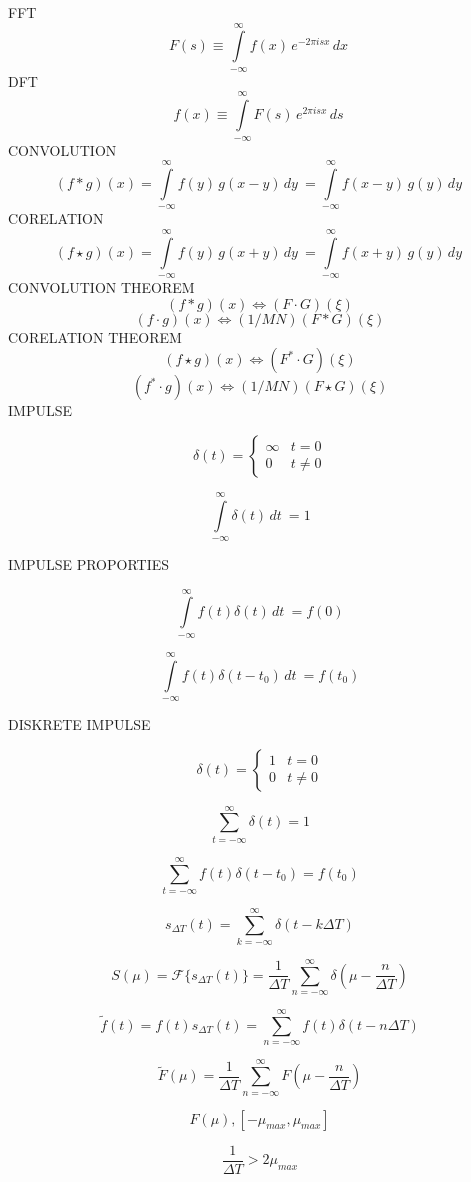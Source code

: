 \documentclass[12pt]{article}
\begin{document}
FFT
$$
F(s) 
\equiv
{\int\limits_{-\infty}^{\infty}f(x)\,e^{-2\pi i s x}\,dx~}
$$
DFT
$$
f(x) 
\equiv
{\int\limits_{-\infty}^{\infty}F(s)\,e^{2\pi i s x}\,ds~}
$$
CONVOLUTION
$$
(f*g)(x)
=
{\int\limits_{-\infty}^{\infty} f(y)\,g(x-y)\,dy~} 
=
{\int\limits_{-\infty}^{\infty} f(x-y)\,g(y)\,dy~}  
$$
CORELATION
$$
(f \star g)(x) 
= 
{\int\limits_{-\infty}^{\infty} f(y)\,g(x+y)\,dy~} 
= 
{\int\limits_{-\infty}^{\infty} f(x+y)\,g(y)\,dy~}  
$$
CONVOLUTION THEOREM
$$
{(f*g)(x)}
\Leftrightarrow 
{(F \cdot G )(\xi)}
$$
$$
{(f \cdot g)(x)}
\Leftrightarrow 
{(1/MN)(F*G )(\xi)}
$$
CORELATION THEOREM
$$
{(f \star g)(x)} 
\Leftrightarrow
{(F^* \cdot G)(\xi)}
$$
$$
{(f^*  \cdot g)(x)} 
\Leftrightarrow
{(1/MN)(F \star G)(\xi)}
$$
IMPULSE

$$
\delta(t)=
\begin{cases}
\infty & t = 0 \\
0	 & t \neq 0
\end{cases}
$$

$$
{\int\limits_{-\infty}^{\infty}\delta(t)\,dt~}
=
1
$$

IMPULSE PROPORTIES

$$
{\int\limits_{-\infty}^{\infty}f(t)\delta(t)\,dt~}
=
f(0)
$$

$$
{\int\limits_{-\infty}^{\infty}f(t)\delta(t-t_{0})\,dt~}
=
f(t_{0})
$$

DISKRETE IMPULSE

$$
\delta(t)=
\begin{cases}
1 & t = 0 \\
0	 & t \neq 0
\end{cases}
$$

$$
\sum_{t = - \infty}^{\infty} \delta(t) 
=
1
$$

$$
\sum_{t = - \infty}^{\infty} f(t) 
\delta(t - t_{0}) 
=
f(t_{0})
$$

$$
s_{\varDelta T}(t) 
=
\sum_{k=-\infty}^{\infty}
\delta(t - k\varDelta T)
$$

$$
S(\mu) = \mathcal{F}
\{ s_{\varDelta T}(t)  \}
=
\frac{1}{\varDelta T}
\sum_{n = - \infty}^{\infty}
\delta(
\mu - \frac{n}{\varDelta T}
)
$$

$$
\tilde{f}(t) = 
f(t)s_{\varDelta T}(t)
=
\sum_{n = -\infty}^{\infty}
f(t)
\delta(t - n\varDelta T)
$$

$$
\tilde{F}(\mu) = 
\frac{1}{\varDelta T}
\sum_{n = - \infty}^{\infty}
F(
\mu - \frac{n}{\varDelta T}
)
$$

$$
F(\mu), [-\mu_{max},\mu_{max} ]
$$

$$
\frac{1}{\varDelta T} 
>
2\mu_{max}
$$
\end{document}
